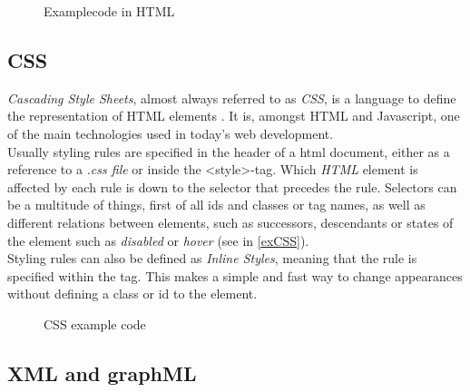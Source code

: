\begin{figure}[!h]

\caption{Examplecode in HTML}
\label{exHTML}
\end{figure}

\subsection{CSS}
\textit{Cascading Style Sheets}, almost always referred to as \textit{CSS}, is a language to define the representation of HTML elements \cite{hogan_2011,css-web-dokumentation}. It is, amongst HTML and Javascript, one of the main technologies used in today's web development.\\
Usually styling rules are specified in the header of a html document, either as a reference to a \textit{.css file} or inside the \textless style\textgreater-tag. Which \textit{HTML} element is affected by each rule is down to the selector that precedes the rule. Selectors can be a multitude of things, first of all ids and classes or tag names, as well as different relations between elements, such as successors, descendants or states of the element such as \textit{disabled} or \textit{hover} (see in \autoref{exCSS}).\\
Styling rules can also be defined as \textit{Inline Styles}, meaning that the rule is specified within the tag. This makes a simple and fast way to change appearances without defining a class or id to the element.

\begin{figure}[!h]

\caption{CSS example code}
\label{exCSS}
\end{figure}

\subsection{XML and graphML}
